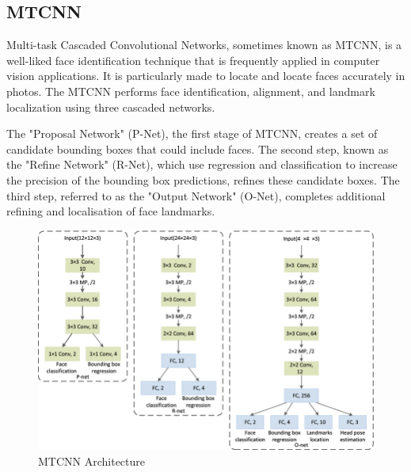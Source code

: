 \subsection{MTCNN}
Multi-task Cascaded Convolutional Networks, sometimes known as MTCNN, is a well-liked face identification technique that is frequently applied in computer vision applications. It is particularly made to locate and locate faces accurately in photos. The MTCNN performs face identification, alignment, and landmark localization using three cascaded networks.

The "Proposal Network" (P-Net), the first stage of MTCNN, creates a set of candidate bounding boxes that could include faces. The second step, known as the "Refine Network" (R-Net), which use regression and classification to increase the precision of the bounding box predictions, refines these candidate boxes. The third step, referred to as the "Output Network" (O-Net), completes additional refining and localisation of face landmarks.
\begin{figure}[h]
    \centering
    \includegraphics[width= 5in ]{img/MTCNN.png}
    \caption{MTCNN Architecture}
\end{figure}